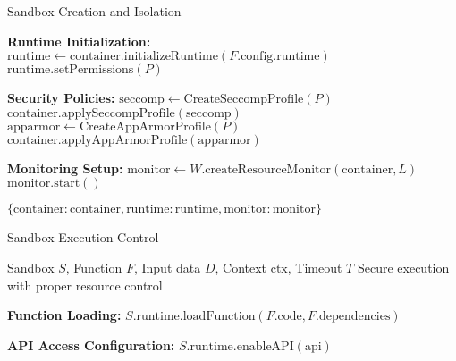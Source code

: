 \begin{tcolorbox}
\begin{tcolorbox}
\begin{protocol}{Sandbox Creation and Isolation}
\begin{algorithmic}[1]
\State \textbf{Runtime Initialization:}
\State $\text{runtime} \gets \text{container}.\text{initializeRuntime}(F.\text{config}.\text{runtime})$
\State $\text{runtime}.\text{setPermissions}(P)$

\State \textbf{Security Policies:}
\State $\text{seccomp} \gets \text{CreateSeccompProfile}(P)$
\State $\text{container}.\text{applySeccompProfile}(\text{seccomp})$
\State $\text{apparmor} \gets \text{CreateAppArmorProfile}(P)$
\State $\text{container}.\text{applyAppArmorProfile}(\text{apparmor})$

\State \textbf{Monitoring Setup:}
\State $\text{monitor} \gets W.\text{createResourceMonitor}(\text{container}, L)$
\State $\text{monitor}.\text{start}()$

\State \Return $\{\text{container}: \text{container}, \text{runtime}: \text{runtime}, \text{monitor}: \text{monitor}\}$
\end{algorithmic}
\end{protocol}
\end{tcolorbox}


\begin{tcolorbox}[
    enhanced,
    colback=blue!5!white,
    colframe=blue!75!black,
    arc=5mm,
    boxrule=1.5pt,
    title=Sandbox Protocol,
    fonttitle=\bfseries,
    coltitle=white,
    attach boxed title to top left={yshift=-2mm, xshift=5mm},
    boxed title style={colback=blue!75!black, rounded corners},
    shadow={2mm}{-2mm}{0mm}{black!50},
    drop fuzzy shadow
]
\begin{tcolorbox}[
    enhanced,
    colback=blue!5!white,
    colframe=blue!75!black,
    arc=5mm,
    boxrule=1.5pt,
    title=Protocol,
    fonttitle=\bfseries,
    coltitle=white,
    attach boxed title to top left={yshift=-2mm, xshift=5mm},
    boxed title style={colback=blue!75!black, rounded corners},
    shadow={2mm}{-2mm}{0mm}{black!50},
    drop fuzzy shadow
]
\begin{protocol}{Sandbox Execution Control}
\label{prot:sandbox-execution}
\begin{algorithmic}[1]
\Require Sandbox $S$, Function $F$, Input data $D$, Context $\text{ctx}$, Timeout $T$
\Ensure Secure execution with proper resource control

\State \textbf{Function Loading:}
\State $S.\text{runtime}.\text{loadFunction}(F.\text{code}, F.\text{dependencies})$

\State \textbf{API Access Configuration:}
        \State $S.\text{runtime}.\text{enableAPI}(\text{api})$
    \EndIf
\EndFor


\end{algorithmic}
\end{protocol}
\end{tcolorbox}
\end{tcolorbox}
\end{tcolorbox}
